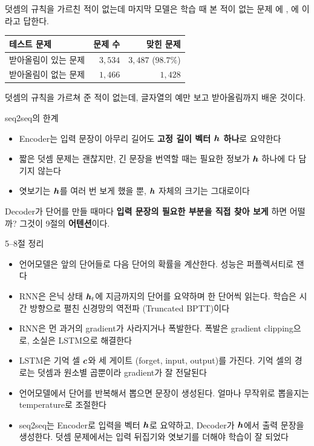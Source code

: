 \documentclass[aspectratio=169,11pt]{beamer}
\begin{document}
\begin{frame}{덧셈의 규칙을 가르친 적이 없는데}
마지막 모델은 학습 때 본 적이 없는 문제 에 , 에 이라고 답한다.
\vskip3mm
\centering
\begin{tabular}{@{}lrr@{}}
\toprule
테스트 문제 & 문제 수 & 맞힌 문제 \\
\midrule
받아올림이 있는 문제 & $3{,}534$ & $3{,}487$ ($98.7\%$) \\
받아올림이 없는 문제 & $1{,}466$ & $1{,}428$ \\
\bottomrule
\end{tabular}
\vskip3mm
\raggedright
\begin{keybox}
덧셈의 규칙을 가르쳐 준 적이 없는데, 글자열의 예만 보고 받아올림까지 배운 것이다.
\end{keybox}
\end{frame}

\begin{frame}{seq2seq의 한계}
\begin{itemize}
\item Encoder는 입력 문장이 아무리 길어도 \textbf{고정 길이 벡터 $\bm{h}$ 하나}로 요약한다
\item 짧은 덧셈 문제는 괜찮지만, 긴 문장을 번역할 때는 필요한 정보가 $\bm{h}$ 하나에 다 담기지 않는다
\item 엿보기는 $\bm{h}$를 여러 번 보게 했을 뿐, $\bm{h}$ 자체의 크기는 그대로이다
\end{itemize}
\vskip3mm
\begin{keybox}
Decoder가 단어를 만들 때마다 \textbf{입력 문장의 필요한 부분을 직접 찾아 보게} 하면 어떨까?
그것이 9절의 \textbf{어텐션}이다.
\end{keybox}
\end{frame}

\begin{frame}{5--8절 정리}
\begin{mlbox}
\small
\begin{itemize}
\item 언어모델은 앞의 단어들로 다음 단어의 확률을 계산한다. 성능은 퍼플렉서티로 잰다
\item RNN은 은닉 상태 $\bm{h}_t$에 지금까지의 단어를 요약하며 한 단어씩 읽는다.
학습은 시간 방향으로 펼친 신경망의 역전파 (Truncated BPTT)이다
\item RNN은 먼 과거의 gradient가 사라지거나 폭발한다. 폭발은 gradient clipping으로, 소실은 LSTM으로 해결한다
\item LSTM은 기억 셀 $\bm{c}$와 세 게이트 (forget, input, output)를 가진다.
기억 셀의 경로는 덧셈과 원소별 곱뿐이라 gradient가 잘 전달된다
\item 언어모델에서 단어를 반복해서 뽑으면 문장이 생성된다. 얼마나 무작위로 뽑을지는 temperature로 조절한다
\item seq2seq는 Encoder로 입력을 벡터 $\bm{h}$로 요약하고, Decoder가 $\bm{h}$에서 출력 문장을 생성한다.
덧셈 문제에서는 입력 뒤집기와 엿보기를 더해야 학습이 잘 되었다
\end{itemize}
\end{mlbox}
\end{frame}
\end{document}
